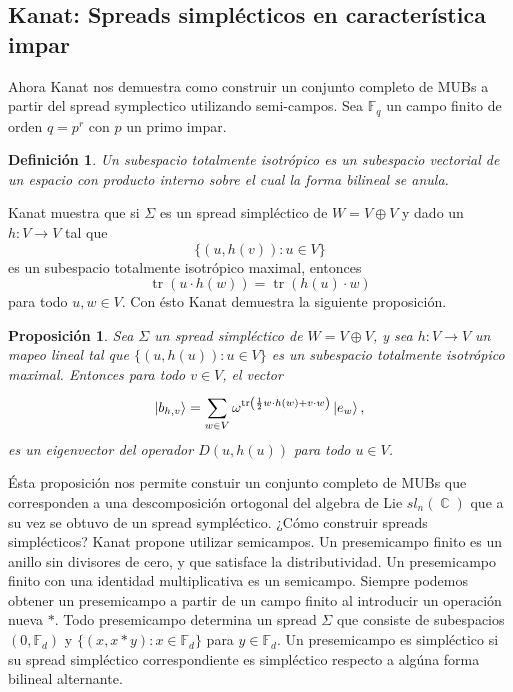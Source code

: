\documentclass[a4paper]{report}
\DeclareMathOperator{\C}{\mathbb{C}}
\DeclareMathOperator{\tr}{tr}
\newtheorem{definition}{Definición}
\newtheorem{proposition}{Proposición}
\begin{document}
  \subsection{Kanat: Spreads simplécticos en característica
  impar}

  Ahora Kanat nos demuestra como construir un conjunto
  completo de MUBs a partir del spread symplectico
  utilizando semi-campos. Sea $\mathbb F_q$ un campo finito
  de orden $q = p^{r}$ con $p$ un primo impar.
  \begin{definition}
    Un subespacio totalmente isotrópico es un subespacio
    vectorial de un espacio con producto interno sobre el
    cual la forma bilineal se anula.
  \end{definition}
  Kanat muestra que si $\Sigma$ es un spread simpléctico de
  $W = V \oplus V$ y dado un $h : V \to V$ tal que
  \[
    \{(u,h(v)) : u \in V\}
  \] 
  es un subespacio totalmente isotrópico maximal, entonces
  \[
    \tr(u \cdot h(w))
    = \tr(h(u) \cdot w)
  \] 
  para todo $u,w \in V$. Con ésto Kanat demuestra la
  siguiente proposición.
  \begin{proposition}
    Sea $\Sigma$ un spread simpléctico de $W = V \oplus V$,
    y sea $h : V \to V$ un mapeo lineal tal que $\{(u,h(u))
    : u \in V\}$ es un subespacio totalmente isotrópico
    maximal. Entonces para todo $v \in V$, el vector
    \[
      \ket{b_{h,v}}
      = \sum_{w \in V}^{} \omega^{\tr\left( \frac{1}{2} w
      \cdot h(w) + v \cdot w \right) } \ket{e_w},
    \] 
    es un eigenvector del operador $D(u,h(u))$ para todo $u
    \in V$.
  \end{proposition}
  Ésta proposición nos permite constuir un conjunto completo
  de MUBs que corresponden a una descomposición ortogonal
  del algebra de Lie $sl_n(\C)$ que a su vez se obtuvo de un
  spread sympléctico. ¿Cómo construir spreads simplécticos?
  Kanat propone utilizar semicampos. Un presemicampo finito es
  un anillo sin divisores de cero, y que satisface la
  distributividad. Un presemicampo finito con una identidad
  multiplicativa es un semicampo. Siempre podemos obtener un
  presemicampo a partir de un campo finito al introducir un
  operación nueva $*$. Todo presemicampo determina un spread
  $\Sigma$ que consiste de subespacios $(0,\mathbb F_d)$ y
  $\{(x, x * y) : x \in \mathbb F_d\}$ para $y \in \mathbb
  F_d$. Un presemicampo es simpléctico si su spread
  simpléctico correspondiente es simpléctico respecto a
  algúna forma bilineal alternante.
\end{document}
